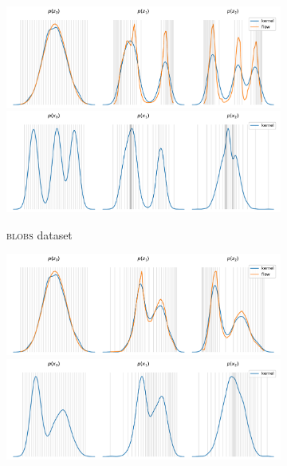 \begin{figure}[!htb]
  \begin{center}
    \begin{subfigure}[b]{0.48\linewidth}
      \centering
      \includegraphics[width=\linewidth, trim=0 0 0 20, clip]{figures/1D/BLOBS/plot_generative_flow_evolution.pdf}
      \includegraphics[width=\linewidth, trim=0 0 0 26, clip]{figures/1D/BLOBS/plot_normalizing_flow_evolution.pdf}
      \caption{\textsc{blobs} dataset}
      \label{fig:NF_1D_BLOBS}
    \end{subfigure}
    \hfill{\color{lightgray}\vrule}\hfill
    \begin{subfigure}[b]{0.48\linewidth}
      \centering
      \includegraphics[width=\linewidth, trim=0 0 0 20, clip]{figures/1D/GAUSSIANMIXTURE/plot_generative_flow_evolution.pdf}
      \includegraphics[width=\linewidth, trim=0 0 0 26, clip]{figures/1D/GAUSSIANMIXTURE/plot_normalizing_flow_evolution.pdf}

\end{subfigure}
\end{center}
\end{figure}
